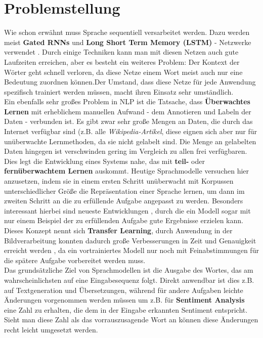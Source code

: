 \section{Problemstellung}
Wie schon erw\"ahnt muss Sprache sequentiell versarbeitet werden. Dazu werden meist \textbf{Gated RNNs} und \textbf{Long Short Term Memory (LSTM)} - Netzwerke verwendet \cite{attention}. Durch einige Techniken kann man mit diesen Netzen auch gute Laufzeiten erreichen, aber es besteht ein weiteres Problem: Der Kontext der W\"orter geht schnell verloren, da diese Netze einem Wort meist auch nur eine Bedeutung zuordnen k\"onnen.Der Umstand, dass diese Netze f\"ur jede Anwendung spezifisch trainiert werden m\"ussen, macht ihren Einsatz sehr umst\"andlich.\\
Ein ebenfalls sehr gro{\ss}es Problem in NLP ist die Tatsache, dass \textbf{\"Uberwachtes Lernen} mit erheblichem manuellen Aufwand - dem Annotieren und Labeln der Daten - verbunden ist. Es gibt zwar sehr gro{\ss}e Mengen an Daten, die durch das Internet verf\"ugbar sind (z.B. alle \textit{Wikipedia-Artikel}, diese eignen sich aber nur f\"ur un\"uberwachte Lernmethoden, da sie nicht gelabelt sind. Die Menge an gelabelten Daten hingegen ist verschwinden gering im Vergleich zu allen frei verf\"ugbaren. Dies legt die Entwicklung eines Systems nahe, das mit \textbf{teil-} oder \textbf{fern\"uberwachtem Lernen} auskommt. Heutige Sprachmodelle versuchen hier anzusetzen, indem sie in einem ersten Schritt un\"uberwacht mit Korpussen unterschiedlicher Gr\"o{\ss}e die Repr\"asentation einer Sprache lernen, um dann im zweiten Schritt an die zu erf\"ullende Aufgabe angepasst zu werden. Besonders interessant hierbei sind neueste Entwicklungen \cite{gpt3}, durch die ein Modell sogar mit nur einem Beispiel der zu erf\"ullenden Aufgabe gute Ergebnisse erzielen kann. Dieses Konzept nennt sich \textbf{Transfer Learning}, durch Anwendung in der Bildverarbeitung konnten dadurch gro{\ss}e Verbesserungen in Zeit und Genauigkeit erreicht werden \cite{ulm}, da ein vortrainiertes Modell nur noch mit Feinabstimmungen f\"ur die sp\"atere Aufgabe vorbereitet werden muss.\\
Das grunds\"atzliche Ziel von Sprachmodellen ist die Ausgabe des Wortes, das am wahrscheinlichsten auf eine Eingabesequenz folgt. Direkt anwendbar ist dies z.B. auf Textgeneration und \"Ubersetzungen, w\"ahrend f\"ur andere Aufgaben leichte \"Anderungen vorgenommen werden m\"ussen um z.B. f\"ur \textbf{Sentiment Analysis} eine Zahl zu erhalten, die dem in der Eingabe erkannten Sentiment entspricht. Sieht man diese Zahl als das vorrauszusagende Wort an k\"onnen diese \"Anderungen recht leicht umgesetzt werden.




